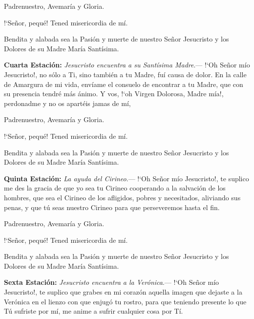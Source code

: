 Padrenuestro, Avemaría y Gloria.

{!`}Señor, pequé! Tened misericordia de mí.

Bendita y alabada sea la Pasión y muerte de nuestro Señor Jesucristo y los Dolores de su Madre María Santísima.

\vspace{2mm}

\textbf{Cuarta Estación:} \textit{Jesucristo encuentra a su Santísima Madre}.--- {!`}Oh Señor mío Jesucristo!, no sólo a Ti, sino también a tu Madre, fuí causa de dolor. En la calle de
Amargura de mi vida, envíame el consuelo de encontrar a tu Madre, que con su presencia tendré más ánimo. Y vos, {!`}oh Virgen Dolorosa, Madre mía!, perdonadme y no os apartéis jamas de mí,

\vspace{2mm}

Padrenuestro, Avemaría y Gloria.

{!`}Señor, pequé! Tened misericordia de mí.

Bendita y alabada sea la Pasión y muerte de nuestro Señor Jesucristo y los Dolores de su Madre María Santísima.

\vspace{2mm}

\textbf{Quinta Estación:} \textit{La ayuda del Cirineo}.--- {!`}Oh Señor mío Jesucristo!, te suplico me des la gracia de que yo sea tu Cirineo cooperando a la
salvación de los hombres, que sea el Cirineo de los afligidos, pobres y necesitados, aliviando sus penas, y que tú seas nuestro Cirineo para que perseveremos hasta el fin.

\vspace{2mm}

Padrenuestro, Avemaría y Gloria.

{!`}Señor, pequé! Tened misericordia de mí.

Bendita y alabada sea la Pasión y muerte de nuestro Señor Jesucristo y los Dolores de su Madre María Santísima.

\vspace{2mm}

\textbf{Sexta Estación:} \textit{Jesucristo encuentra a la Verónica}.--- {!`}Oh Señor mío Jesucristo!, te suplico que grabes en mi corazón aquella imagen que dejaste a la Verónica
en el lienzo con que enjugó tu rostro, para que teniendo presente lo que Tú sufriste por mí, me anime a sufrir cualquier cosa por Tí.

\vspace{2mm}

